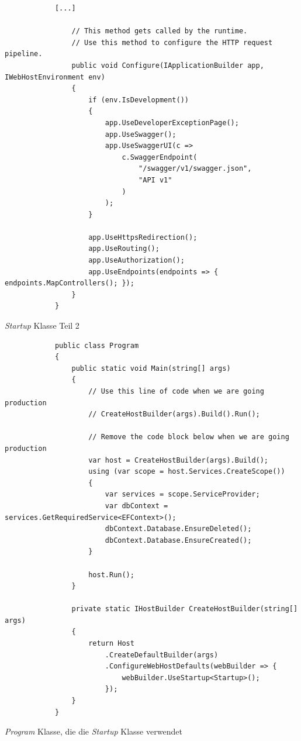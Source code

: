 \documentclass[a4paper, fontsize=11pt, parskip=half, twoside]{scrreprt}
\begin{document}
	\begin{listing}[ht]
		\begin{verbatim}
			[...]
				
				// This method gets called by the runtime. 
				// Use this method to configure the HTTP request pipeline.
				public void Configure(IApplicationBuilder app, IWebHostEnvironment env)
				{
					if (env.IsDevelopment())
					{
						app.UseDeveloperExceptionPage();
						app.UseSwagger();
						app.UseSwaggerUI(c => 
							c.SwaggerEndpoint(
								"/swagger/v1/swagger.json", 
								"API v1"
							)
						);
					}
					
					app.UseHttpsRedirection();
					app.UseRouting();
					app.UseAuthorization();
					app.UseEndpoints(endpoints => { endpoints.MapControllers(); });
				}
			}
		\end{verbatim}
		\caption{\emph{Startup} Klasse Teil 2}
		\label{lst:startupClassPart2}
	\end{listing}

	\begin{listing}[ht]
		\begin{verbatim}
			public class Program
			{
				public static void Main(string[] args)
				{
					// Use this line of code when we are going production
					// CreateHostBuilder(args).Build().Run();
					
					// Remove the code block below when we are going production
					var host = CreateHostBuilder(args).Build();	
					using (var scope = host.Services.CreateScope())
					{
						var services = scope.ServiceProvider;
						var dbContext = services.GetRequiredService<EFContext>();
						dbContext.Database.EnsureDeleted();
						dbContext.Database.EnsureCreated();
					}
					
					host.Run();
				}
				
				private static IHostBuilder CreateHostBuilder(string[] args)
				{
					return Host
						.CreateDefaultBuilder(args)
						.ConfigureWebHostDefaults(webBuilder => { 
							webBuilder.UseStartup<Startup>(); 
						});
				}
			}
		\end{verbatim}
		\caption{\emph{Program} Klasse, die die \emph{Startup} Klasse verwendet}
		\label{lst:programClass}
	\end{listing}
\end{document}
